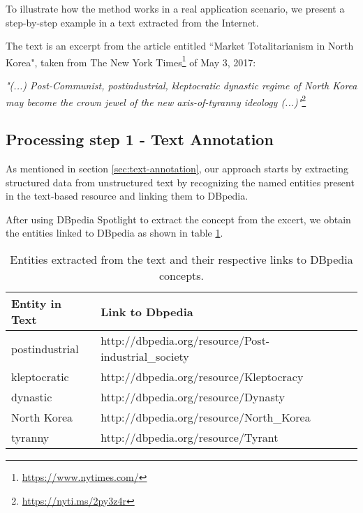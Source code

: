 To illustrate how the method works in a real application scenario, we present a step-by-step example in a text extracted from the Internet.

The text is an excerpt from the article entitled ``Market Totalitarianism in North Korea", taken from The New York Times\footnote{\url{https://www.nytimes.com/}} of May 3, 2017: \

\textit{"(...) Post-Communist, postindustrial, kleptocratic dynastic regime of North Korea may become the crown jewel of the new axis-of-tyranny ideology (...)"}\footnote{\url{https://nyti.ms/2py3z4r}} \

\subsection{\hspace*{3pt} Processing step 1 - Text Annotation} 

As mentioned in section \ref{sec:text-annotation}, our approach starts by extracting structured data from unstructured text by recognizing the named entities present in the text-based resource and linking them to DBpedia. 

After using DBpedia Spotlight to extract the concept from the excert, we obtain the entities linked to DBpedia as shown in table \ref{tab:example-entities}.

\begin{table}[H]
\centering
\caption{Entities extracted from the text and their respective links to DBpedia concepts.}
\label{tab:example-entities}
\begin{tabular}{@{}ll@{}}
\toprule
Entity in Text & Link to Dbpedia                                  \\ \midrule
postindustrial & http://dbpedia.org/resource/Post-industrial\_society \\
kleptocratic   & http://dbpedia.org/resource/Kleptocracy              \\
dynastic       & http://dbpedia.org/resource/Dynasty                  \\
North Korea    & http://dbpedia.org/resource/North\_Korea             \\
tyranny        & http://dbpedia.org/resource/Tyrant                   \\ \bottomrule
\end{tabular}
\end{table}


